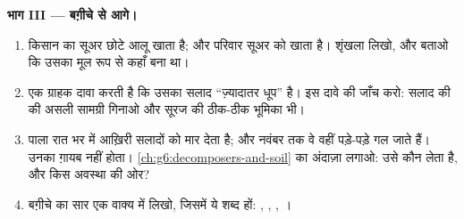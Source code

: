 \begin{problem}[{सप्ताहांत समस्या --- किसी सब्ज़ी-बग़ीचे का प्रकाश,
पत्तियाँ और बहीखाता}]
\medskip\noindent\textbf{भाग III --- बग़ीचे से आगे।}
\begin{enumerate}[resume]
  \item किसान का सूअर छोटे आलू खाता है; और परिवार सूअर को खाता है।
        शृंखला लिखो, और बताओ कि उसका  मूल रूप से कहाँ
        बना था।
  \item एक ग्राहक दावा करती है कि उसका सलाद ``ज़्यादातर धूप'' है। इस
        दावे की जाँच करो: सलाद की  की असली सामग्री गिनाओ और सूरज
        की ठीक-ठीक भूमिका भी।
  \item पाला रात भर में आख़िरी सलादों को मार देता है; और नवंबर तक वे
        वहीं पड़े-पड़े गल जाते हैं। उनका  ग़ायब नहीं
        होता। \cref{ch:g6:decomposers-and-soil} का अंदाज़ा लगाओ: उसे
        कौन लेता है, और किस अवस्था की ओर?
  \item बग़ीचे का सार एक वाक्य में लिखो, जिसमें ये शब्द हों: ,
        , , ।
\end{enumerate}
\end{problem}

